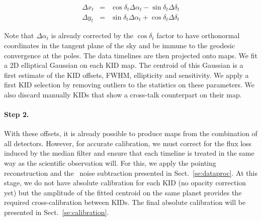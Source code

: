 \begin{eqnarray}
\Delta x_t &=& \cos\delta_t \Delta\alpha_t - \sin \delta_t\Delta \delta_t \nonumber \\
\Delta y_t &=& \sin\delta_t \Delta\alpha_t + \cos \delta_t\Delta \delta_t \nonumber
\end{eqnarray}

Note that $\Delta\alpha_t$ is already corrected by the $\cos\delta_t$ factor to
have orthonormal coordinates in the tangent plane of the sky and be immune to
the geodesic convergence at the poles.
The data timelines are then projected onto maps. 
We fit a 2D elliptical Gaussian on
each KID map. The centroid of this Gaussian is a first estimate of the KID
offsets, FWHM, ellipticity and sensitivity. We apply a first KID selection by
removing outliers to the statistics on these parameters. We also discard
manually KIDs that show a cross-talk counterpart on their map.

\paragraph{Step 2.} With these offsets, it is already possible to
produce maps from the combination of all detectors. However, for
accurate calibration, we must correct for the flux loss
induced by the median filter and ensure that each timeline is treated
in the same way as the scientific observation will. For this, we apply
the pointing reconstruction and the \cmoneb\ noise subtraction
presented in Sect.~\ref{se:dataproc}.
At this stage, we do not have
absolute calibration for each KID (no opacity correction yet) but the
amplitude of the fitted centroid on the same planet provides the required
cross-calibration between KIDs. The final absolute calibration will be
presented in Sect.~\ref{se:calibration}.\\


